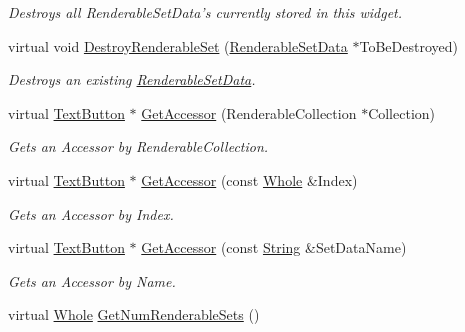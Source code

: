 \begin{DoxyCompactItemize}
\begin{DoxyCompactList}\small\item\em Destroys all RenderableSetData's currently stored in this widget. \item\end{DoxyCompactList}\item 
virtual void \hyperlink{classMezzanine_1_1UI_1_1TabSet_aadfa25f3232b2012f0247c556f040615}{DestroyRenderableSet} (\hyperlink{structMezzanine_1_1UI_1_1RenderableSetData}{RenderableSetData} $\ast$ToBeDestroyed)
\begin{DoxyCompactList}\small\item\em Destroys an existing \hyperlink{structMezzanine_1_1UI_1_1RenderableSetData}{RenderableSetData}. \item\end{DoxyCompactList}\item 
virtual \hyperlink{classMezzanine_1_1UI_1_1TextButton}{TextButton} $\ast$ \hyperlink{classMezzanine_1_1UI_1_1TabSet_aa52787865ef814fbacc1c2badd8d57e6}{GetAccessor} (RenderableCollection $\ast$Collection)
\begin{DoxyCompactList}\small\item\em Gets an Accessor by RenderableCollection. \item\end{DoxyCompactList}\item 
virtual \hyperlink{classMezzanine_1_1UI_1_1TextButton}{TextButton} $\ast$ \hyperlink{classMezzanine_1_1UI_1_1TabSet_a0351acf8a015618188589cfe1c7ee4ed}{GetAccessor} (const \hyperlink{namespaceMezzanine_adcbb6ce6d1eb4379d109e51171e2e493}{Whole} \&Index)
\begin{DoxyCompactList}\small\item\em Gets an Accessor by Index. \item\end{DoxyCompactList}\item 
virtual \hyperlink{classMezzanine_1_1UI_1_1TextButton}{TextButton} $\ast$ \hyperlink{classMezzanine_1_1UI_1_1TabSet_a0196021d80bb0e1fa43d254da6facd79}{GetAccessor} (const \hyperlink{namespaceMezzanine_acf9fcc130e6ebf08e3d8491aebcf1c86}{String} \&SetDataName)
\begin{DoxyCompactList}\small\item\em Gets an Accessor by Name. \item\end{DoxyCompactList}\item 
virtual \hyperlink{namespaceMezzanine_adcbb6ce6d1eb4379d109e51171e2e493}{Whole} \hyperlink{classMezzanine_1_1UI_1_1TabSet_aeed203c0d970a51b12e8559211cfaeba}{GetNumRenderableSets} ()

\end{DoxyCompactItemize}
